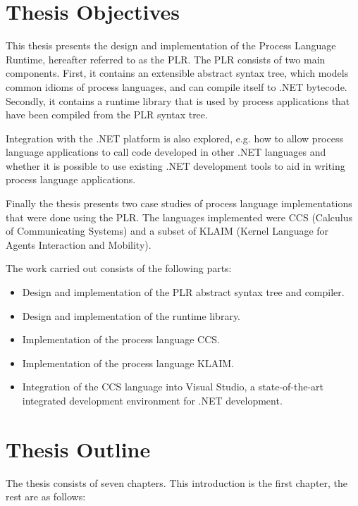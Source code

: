 \section{Thesis Objectives}

This thesis presents the design and implementation of the Process Language Runtime, hereafter referred to as the PLR. The PLR consists of two main components. First, it contains an extensible abstract syntax tree, which models common idioms of process languages, and can compile itself to .NET bytecode. Secondly, it contains a runtime library that is used by process applications that have been compiled from the PLR syntax tree. 

Integration with the .NET platform is also explored, e.g. how to allow process language applications to call code developed in other .NET languages and whether it is possible to use existing .NET development tools to aid in writing process language applications.

Finally the thesis presents two case studies of process language implementations that were done using the PLR. The languages implemented were CCS (Calculus of Communicating Systems) and a subset of KLAIM (Kernel Language for Agents Interaction and Mobility).

The work carried out consists of the following parts:

\begin{itemize}
  \item Design and implementation of the PLR abstract syntax tree and compiler.
  \item Design and implementation of the runtime library.
  \item Implementation of the process language CCS.
  \item Implementation of the process language KLAIM.
  \item Integration of the CCS language into Visual Studio, a state-of-the-art 
  			integrated development environment for .NET development.
\end{itemize}


\section{Thesis Outline}

The thesis consists of seven chapters. This introduction is the first chapter, the rest are as follows:

